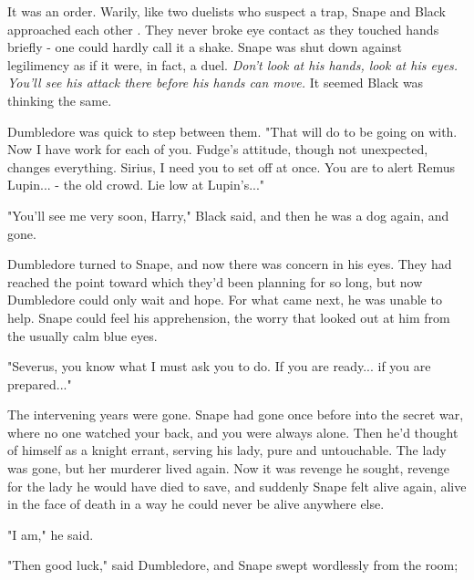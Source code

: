 \documentclass[a4paper,11pt]{article}
\begin{document}
It was an order. Warily, like two duelists who suspect a trap, Snape and Black approached each other . They never broke eye contact as they touched hands briefly - one could hardly call it a shake. Snape was shut down against legilimency as if it were, in fact, a duel. \emph{Don't look at his hands, look at his eyes. You'll see his attack there before his hands can move.} It seemed Black was thinking the same.

Dumbledore was quick to step between them. "That will do to be going on with. Now I have work for each of you. Fudge's attitude, though not unexpected, changes everything. Sirius, I need you to set off at once. You are to alert Remus Lupin... - the old crowd. Lie low at Lupin's..."

"You'll see me very soon, Harry," Black said, and then he was a dog again, and gone.

Dumbledore turned to Snape, and now there was concern in his eyes. They had reached the point toward which they'd been planning for so long, but now Dumbledore could only wait and hope. For what came next, he was unable to help. Snape could feel his apprehension, the worry that looked out at him from the usually calm blue eyes.

"Severus, you know what I must ask you to do. If you are ready... if you are prepared..."

The intervening years were gone. Snape had gone once before into the secret war, where no one watched your back, and you were always alone. Then he'd thought of himself as a knight errant, serving his lady, pure and untouchable. The lady was gone, but her murderer lived again. Now it was revenge he sought, revenge for the lady he would have died to save, and suddenly Snape felt alive again, alive in the face of death in a way he could never be alive anywhere else.

"I am," he said.

"Then good luck," said Dumbledore, and Snape swept wordlessly from the room;
\end{document}
